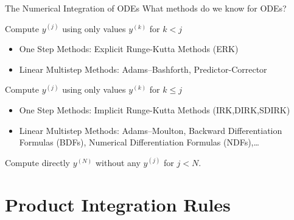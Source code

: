 \documentclass[aspectratio=169,xcolor=dvipsnames]{beamer}
\begin{document}
\begin{frame}{The Numerical Integration of ODEs}
What methods do we know for ODEs?


\begin{description}
	\item<3->[Explicit methods:] Compute $y^{(j)}$ using only values $y^{(k)}$ for $k < j$
	\begin{itemize}
		\item<7-> One Step Methods: Explicit Runge-Kutta Methods (ERK)
		\item<7-> Linear Multistep Methods: Adams--Bashforth, Predictor-Corrector 
	\end{itemize}
	\item<4->[Implicit methods:] Compute $y^{(j)}$ using only values $y^{(k)}$ for $k \leq j$
	\begin{itemize}
		\item<8-> One Step Methods: Implicit Runge-Kutta Methods (IRK,DIRK,SDIRK)
		\item<8-> Linear Multistep Methods: Adams--Moulton, Backward Differentiation Formulas (BDFs), Numerical Differentiation Formulas (NDFs),\ldots
	\end{itemize}
	\item<5->[Exponential integrators:] Compute directly $y^{(N)}$ without any $y^{(j)}$ for $j < N$.
\end{description}



\end{frame}

\section{Product Integration Rules}
\end{document}
